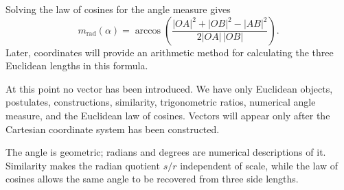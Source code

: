 \begin{derivationbox}
Solving the law of cosines for the angle measure gives
\[
\boxed{
m_{\mathrm{rad}}(\alpha)
=
\arccos\left(
\frac{|OA|^2+|OB|^2-|AB|^2}{2|OA|\,|OB|}
\right)
}.
\]
Later, coordinates will provide an arithmetic method for calculating the three
Euclidean lengths in this formula.
\end{derivationbox}

\begin{remarkbox}
At this point no vector has been introduced. We have only Euclidean objects,
postulates, constructions, similarity, trigonometric ratios, numerical angle
measure, and the Euclidean law of cosines. Vectors will appear only after the
Cartesian coordinate system has been constructed.
\end{remarkbox}

\begin{summarybox}
The angle is geometric; radians and degrees are numerical descriptions of it.
Similarity makes the radian quotient $s/r$ independent of scale, while the law
of cosines allows the same angle to be recovered from three side lengths.
\end{summarybox}
